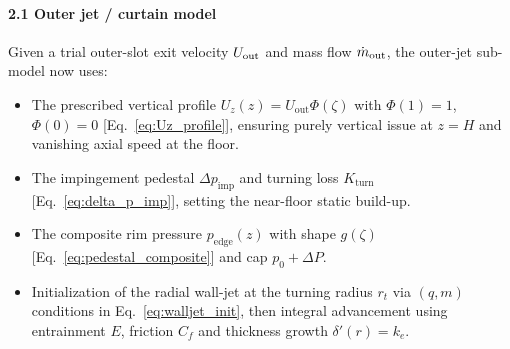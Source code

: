 \documentclass[11pt,a4paper]{article}
\begin{document}
\paragraph{2.1 Outer jet / curtain model}  
Given a trial outer-slot exit velocity \(U_{\rm out}\) and mass flow \(\dot m_{\rm out}\), the outer-jet sub-model now uses:
\begin{itemize}
  \item The prescribed vertical profile \(U_z(z)=U_{\mathrm{out}}\Phi(\zeta)\) with \(\Phi(1)=1\), \(\Phi(0)=0\) [Eq.~\eqref{eq:Uz_profile}], ensuring purely vertical issue at \(z=H\) and vanishing axial speed at the floor.
  \item The impingement pedestal \(\Delta p_{\mathrm{imp}}\) and turning loss \(K_{\mathrm{turn}}\) [Eq.~\eqref{eq:delta_p_imp}], setting the near-floor static build-up.
  \item The composite rim pressure \(p_{\mathrm{edge}}(z)\) with shape \(g(\zeta)\) [Eq.~\eqref{eq:pedestal_composite}] and cap \(p_0+\Delta P\).
  \item Initialization of the radial wall-jet at the turning radius \(r_t\) via \((q,m)\) conditions in Eq.~\eqref{eq:walljet_init}, then integral advancement using entrainment \(E\), friction \(C_f\) and thickness growth \(\delta'(r)=k_e\).
\end{itemize}
\end{document}
